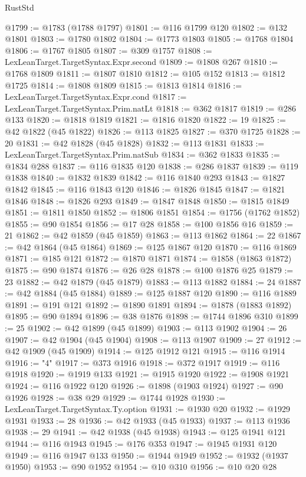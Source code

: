 \begin{lexlean}{RustStd}
\begin{coremodule}
@1799 := @1783 (@1788 @1797)
@1801 := @116 @1799 @120
@1802 := @132 @1801
@1803 := @1780 @1802
@1804 := @1773 @1803
@1805 := @1768 @1804
@1806 := @1767 @1805
@1807 := @309 @1757
@1808 := LexLeanTarget.TargetSyntax.Expr.second
@1809 := @1808 @267
@1810 := @1768 @1809
@1811 := @1807 @1810
@1812 := @105 @152
@1813 := @1812 @1725
@1814 := @1808 @1809
@1815 := @1813 @1814
@1816 := LexLeanTarget.TargetSyntax.Expr.cond
@1817 := LexLeanTarget.TargetSyntax.Prim.natLt
@1818 := @362 @1817
@1819 := @286 @133
@1820 := @1818 @1819
@1821 := @1816 @1820
@1822 := 19
@1825 := @42 @1822 (@45 @1822)
@1826 := @113 @1825
@1827 := @370 @1725
@1828 := 20
@1831 := @42 @1828 (@45 @1828)
@1832 := @113 @1831
@1833 := LexLeanTarget.TargetSyntax.Prim.natSub
@1834 := @362 @1833
@1835 := @1834 @288
@1837 := @116 @1835 @120
@1838 := @286 @1837
@1839 := @119 @1838
@1840 := @1832 @1839
@1842 := @116 @1840 @293
@1843 := @1827 @1842
@1845 := @116 @1843 @120
@1846 := @1826 @1845
@1847 := @1821 @1846
@1848 := @1826 @293
@1849 := @1847 @1848
@1850 := @1815 @1849
@1851 := @1811 @1850
@1852 := @1806 @1851
@1854 := @1756 (@1762 @1852)
@1855 := @90 @1854
@1856 := @17 @28
@1858 := @100 @1856 @16
@1859 := 21
@1862 := @42 @1859 (@45 @1859)
@1863 := @113 @1862
@1864 := 22
@1867 := @42 @1864 (@45 @1864)
@1869 := @125 @1867 @120
@1870 := @116 @1869
@1871 := @185 @121
@1872 := @1870 @1871
@1874 := @1858 (@1863 @1872)
@1875 := @90 @1874
@1876 := @26 @28
@1878 := @100 @1876 @25
@1879 := 23
@1882 := @42 @1879 (@45 @1879)
@1883 := @113 @1882
@1884 := 24
@1887 := @42 @1884 (@45 @1884)
@1889 := @125 @1887 @120
@1890 := @116 @1889
@1891 := @191 @121
@1892 := @1890 @1891
@1894 := @1878 (@1883 @1892)
@1895 := @90 @1894
@1896 := @38 @1876
@1898 := @1744 @1896 @310
@1899 := 25
@1902 := @42 @1899 (@45 @1899)
@1903 := @113 @1902
@1904 := 26
@1907 := @42 @1904 (@45 @1904)
@1908 := @113 @1907
@1909 := 27
@1912 := @42 @1909 (@45 @1909)
@1914 := @125 @1912 @121
@1915 := @116 @1914
@1916 := "4"
@1917 := @373 @1916
@1918 := @372 @1917
@1919 := @116 @1918
@1920 := @1919 @133
@1921 := @1915 @1920
@1922 := @1908 @1921
@1924 := @116 @1922 @120
@1926 := @1898 (@1903 @1924)
@1927 := @90 @1926
@1928 := @38 @29
@1929 := @1744 @1928
@1930 := LexLeanTarget.TargetSyntax.Ty.option
@1931 := @1930 @20
@1932 := @1929 @1931
@1933 := 28
@1936 := @42 @1933 (@45 @1933)
@1937 := @113 @1936
@1938 := 29
@1941 := @42 @1938 (@45 @1938)
@1943 := @125 @1941 @121
@1944 := @116 @1943
@1945 := @176 @353
@1947 := @1945 @1931 @120
@1949 := @116 @1947 @133
@1950 := @1944 @1949
@1952 := @1932 (@1937 @1950)
@1953 := @90 @1952
@1954 := @10 @310
@1956 := @10 @20 @28

\end{coremodule}
\end{lexlean}
